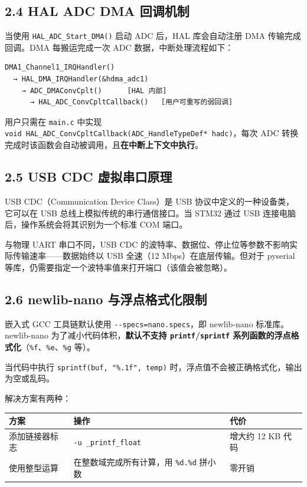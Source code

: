 \documentclass[
  chinese,
  UTF8,
  oneside,
  openany]{ctexbook}
\begin{document}
\subsection{2.4 HAL ADC DMA
回调机制}\label{hal-adc-dma-ux56deux8c03ux673aux5236}

当使用 \texttt{HAL\_ADC\_Start\_DMA()} 启动 ADC 后，HAL 库会自动注册 DMA
传输完成回调。DMA 每搬运完成一次 ADC 数据，中断处理流程如下：

\begin{verbatim}
DMA1_Channel1_IRQHandler()
  → HAL_DMA_IRQHandler(&hdma_adc1)
    → ADC_DMAConvCplt()      [HAL 内部]
      → HAL_ADC_ConvCpltCallback()   [用户可重写的弱回调]
\end{verbatim}

用户只需在 \texttt{main.c} 中实现
\texttt{void\ HAL\_ADC\_ConvCpltCallback(ADC\_HandleTypeDef*\ hadc)}，每次
ADC 转换完成时该函数会自动被调用，且\textbf{在中断上下文中执行}。

\subsection{2.5 USB CDC
虚拟串口原理}\label{usb-cdc-ux865aux62dfux4e32ux53e3ux539fux7406-1}

USB CDC（Communication Device Class）是 USB
协议中定义的一种设备类，它可以在 USB 总线上模拟传统的串行通信接口。当
STM32 通过 USB 连接电脑后，操作系统会将其识别为一个标准 COM 端口。

与物理 UART 串口不同，USB CDC
的波特率、数据位、停止位等参数不影响实际传输速率------数据始终以 USB
全速（12 Mbps）在底层传输。但对于 pyserial
等库，仍需要指定一个波特率值来打开端口（该值会被忽略）。

\subsection{2.6 newlib-nano
与浮点格式化限制}\label{newlib-nano-ux4e0eux6d6eux70b9ux683cux5f0fux5316ux9650ux5236}

嵌入式 GCC 工具链默认使用 \texttt{-\/-specs=nano.specs}，即 newlib-nano
标准库。newlib-nano 为了减小代码体积，\textbf{默认不支持
\texttt{printf}/\texttt{sprintf}
系列函数的浮点格式化}（\texttt{\%f}、\texttt{\%e}、\texttt{\%g} 等）。

当代码中执行 \texttt{sprintf(buf,\ "\%.1f",\ temp)}
时，浮点值不会被正确格式化，输出为空或乱码。

解决方案有两种：

\begin{longtable}[]{@{}lll@{}}
\toprule\noalign{}
方案 & 操作 & 代价 \\
\midrule\noalign{}
\endhead
\bottomrule\noalign{}
\endlastfoot
添加链接器标志 & \texttt{-u\ \_printf\_float} & 增大约 12 KB 代码 \\
使用整型运算 & 在整数域完成所有计算，用 \texttt{\%d.\%d} 拼小数 &
零开销 \\
\end{longtable}
\end{document}
